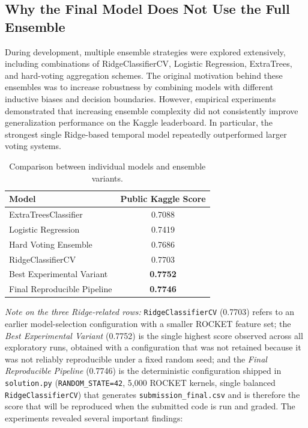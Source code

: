 \documentclass[conference]{IEEEtran}
\begin{document}
\subsection{Why the Final Model Does Not Use the Full Ensemble}
During development, multiple ensemble strategies were explored extensively, including combinations of RidgeClassifierCV, Logistic Regression, ExtraTrees, and hard-voting aggregation schemes. The original motivation behind these ensembles was to increase robustness by combining models with different inductive biases and decision boundaries.
However, empirical experiments demonstrated that increasing ensemble complexity did not consistently improve generalization performance on the Kaggle leaderboard. In particular, the strongest single Ridge-based temporal model repeatedly outperformed larger voting systems.
\begin{table}[!t]
\centering
\caption{Comparison between individual models and ensemble variants.}
\label{tab:ensemblecomparison}
\begin{tabular}{lc}
\toprule
Model & Public Kaggle Score \\
\midrule
ExtraTreesClassifier & 0.7088 \\
Logistic Regression & 0.7419 \\
Hard Voting Ensemble & 0.7686 \\
RidgeClassifierCV & 0.7703 \\
Best Experimental Variant & \textbf{0.7752} \\
Final Reproducible Pipeline & \textbf{0.7746} \\
\bottomrule
\end{tabular}
\end{table}
\noindent\emph{Note on the three Ridge-related rows:} \texttt{RidgeClassifierCV} (0.7703) refers to an earlier model-selection configuration with a smaller ROCKET feature set; the \emph{Best Experimental Variant} (0.7752) is the single highest score observed across all exploratory runs, obtained with a configuration that was not retained because it was not reliably reproducible under a fixed random seed; and the \emph{Final Reproducible Pipeline} (0.7746) is the deterministic configuration shipped in \texttt{solution.py} (\texttt{RANDOM\_STATE=42}, 5{,}000 ROCKET kernels, single balanced \texttt{RidgeClassifierCV}) that generates \texttt{submission\_final.csv} and is therefore the score that will be reproduced when the submitted code is run and graded.
The experiments revealed several important findings:
\end{document}
